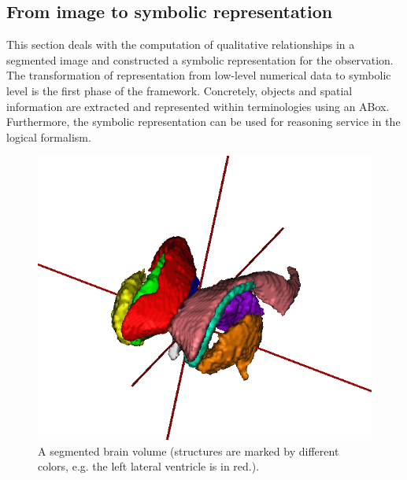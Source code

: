 \documentclass{article}
\newtheorem{mydef}{Definition}
\begin{document}
% 
% 
% 
% 

\subsection{From image to symbolic representation}
 This section deals with the computation of qualitative relationships in a segmented image and constructed a symbolic representation for the observation. 
The transformation of representation from low-level numerical data to symbolic level is the first phase of the framework.
Concretely, objects and spatial information are extracted and represented within terminologies using an ABox.
Furthermore, the symbolic representation can be used for  reasoning service in the logical formalism.

\begin{figure}[h]
 \centering
 \includegraphics[width=.3\textwidth]{./figures/mesh_all_vue_45.png}
 \caption{\label{fig:brain3d}A segmented brain volume (structures are marked by different colors, e.g. the left lateral ventricle is in red.).}
\end{figure}
\end{document}
